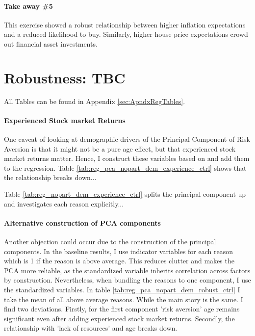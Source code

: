 \documentclass[ProjectABM]{subfiles}
\begin{document}



\paragraph{Take away \#5}
This exercise showed a robust relationship between higher inflation expectations and a reduced likelihood to buy. Similarly, higher house price expectations crowd out financial asset investments.

\section{Robustness: TBC}\label{sec:robustness}
All Tables can be found in Appendix \ref{sec:ApndxRegTables}.

\paragraph{Experienced Stock market Returns}
One caveat of looking at demographic drivers of the Principal Component of Risk Aversion is that it might not be a pure age effect, but that experienced stock market returns matter. Hence, I construct these variables based on \cite{malmendier_2011} and add them to the regression.
Table \ref{tab:reg_pca_nopart_dem_experience_ctrl} shows that the relationship breaks down...

Table \ref{tab:reg_nopart_dem_experience_ctrl} splits the principal component up and investigates each reason explicitly...

\paragraph{Alternative construction of PCA components}
Another objection could occur due to the construction of the principal components. In the baseline results, I use indicator variables for each reason which is 1 if the reason is above average. This reduces clutter and makes the PCA more reliable, as the standardized variable inherits correlation across factors by construction. Nevertheless, when bundling the reasons to one component, I use the standardized variables. In table \ref{tab:reg_pca_nopart_dem_robust_ctrl} I take the mean of all above average reasons. While the main story is the same. I find two deviations. Firstly, for the first component 'risk aversion' age remains significant even after adding experienced stock market returns. Secondly, the relationship with 'lack of resources' and age breaks down.
\end{document}
